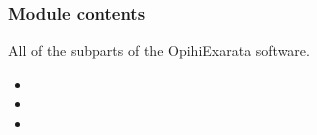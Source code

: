 \documentclass[letterpaper,11pt,english]{sphinxmanual}
\begin{document}
\subsubsection{Module contents}
\label{\detokenize{code/opihiexarata:module-opihiexarata}}\label{\detokenize{code/opihiexarata:module-contents}}
\sphinxAtStartPar
All of the subparts of the OpihiExarata software.
\begin{itemize}
\item {} 
\sphinxAtStartPar
{}

\item {} 
\sphinxAtStartPar
{}

\item {} 
\sphinxAtStartPar
{}

\end{itemize}
\end{document}
